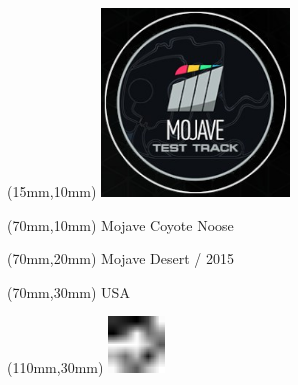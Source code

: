 \null\newpage
\begin{textblock*}{50mm}(15mm,10mm)%
\includegraphics[width=50mm]{LG/MOJA.png}
\end{textblock*}
\begin{textblock*}{130mm}(70mm,10mm)%
{\fontsize{20}{20}\selectfont Mojave Coyote Noose}\\
\end{textblock*}
\begin{textblock*}{120mm}(70mm,20mm)%
{\fontsize{16}{16}\selectfont Mojave Desert / 2015}\\
\end{textblock*}
\begin{textblock*}{120mm}(70mm,30mm)%
{\fontsize{12}{12}\selectfont USA}
\end{textblock*}
\begin{textblock*}{30mm}(110mm,30mm)%
\centering
\includegraphics[height=15mm]{icons/fa-rotate-left.pdf}
\end{textblock*}
